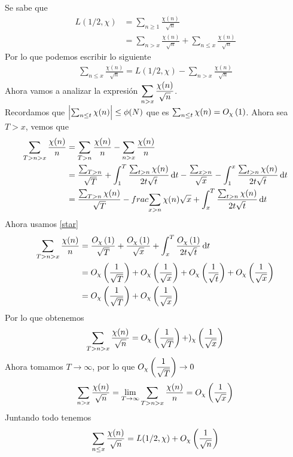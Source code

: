 \begin{sol}
	Se sabe que
	\begin{align*}
		L(1/2,\chi) & =\sum_{n\geq1}\frac{\chi(n)}{\sqrt{n}}                                     \\
		            & =\sum_{n>x}\frac{\chi(n)}{\sqrt{n}}+\sum_{n\leq x}\frac{\chi(n)}{\sqrt{n}}
	\end{align*}
	Por lo que podemos escribir lo siguiente
	\begin{align*}
		\sum_{n\leq x}\frac{\chi(n)}{\sqrt{n}}=L(1/2,\chi)-\sum_{n>x}\frac{\chi(n)}{\sqrt{n}}
	\end{align*}
	Ahora vamos a analizar la expresión $\ds\sum_{n>x}\frac{\chi(n)}{\sqrt{n}}$.\\
	Recordamos que $\abs{\sum_{n\leq t}\chi(n)}\leq\phi(N)$ que es $\sum_{n\leq t}\chi(n)=\BigO[\chi]{1}\label{star}$. Ahora sea $T>x$, vemos que
	\begin{align*}
		\sum_{T>n>x}\frac{\chi(n)}{n} & =\sum_{T>n}\frac{\chi(n)}{n}-\sum_{n>x}\frac{\chi(n)}{n}                                                                                                     \\
		                              & =\frac{\sum_{T>n}}{\sqrt{T}}+\int_1^T\frac{\sum_{t>n}\chi(n)}{2t\sqrt{t}}\d{t}-\frac{\sum_{x>n}}{\sqrt{x}}-\int_1^x\frac{\sum_{t>n}\chi(n)}{2t\sqrt{t}}\d{t} \\
		                              & =\frac{\sum_{T>n}\chi(n)}{\sqrt{T}}-frac{\sum_{x>n}\chi(n)}{\sqrt{x}}+\int_x^T\frac{\sum_{t>n}\chi(n)}{2t\sqrt{t}}\d{t}
	\end{align*}
	Ahora usamos \eqref{star}
	\begin{align*}
		\sum_{T>n>x}\frac{\chi(n)}{n} & = \frac{\BigO[\chi]{1}}{\sqrt{T}}+\frac{\BigO[\chi]{1}}{\sqrt{x}}+\int_x^T\frac{\BigO[\chi]{1}}{2t\sqrt{t}}\d{t}                            \\
		                              & =\BigO[\chi]{\frac1{\sqrt{T}}}+\BigO[\chi]{\frac1{\sqrt{x}}}+\BigO[\chi]{\frac1{\sqrt{t}}}+\BigO[\chi]{\frac1{\sqrt{x}}} \\
		                              & =\BigO[\chi]{\frac1{\sqrt{T}}}+\BigO[\chi]{\frac1{\sqrt{x}}}
	\end{align*}
	Por lo que obtenemos
	\begin{equation*}
		\sum_{T>n>x}\frac{\chi(n)}{\sqrt{n}}=\BigO[\chi]{\frac1{\sqrt{T}}}+)_\chi\paren{\frac1{\sqrt{x}}}
	\end{equation*}
	Ahora tomamos $T\rightarrow\infty$, por lo que $\BigO[\chi]{\dfrac1{\sqrt{T}}}\rightarrow0$
	\begin{equation*}
		\sum_{n>x}\frac{\chi(n)}{\sqrt{n}}=\lim_{T\rightarrow\infty}\sum_{T>n>x}\frac{\chi(n)}{n}=\BigO[\chi]{\frac1{\sqrt{x}}}
	\end{equation*}
	Juntando todo tenemos
	\begin{equation*}
		\sum_{n\leq x}\frac{\chi(n)}{\sqrt{n}}=L(1/2,\chi)+\BigO[\chi]{\frac1{\sqrt{n}}}
	\end{equation*}
\end{sol}

